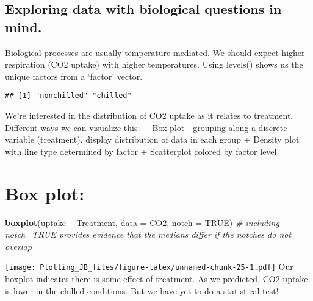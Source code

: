 \documentclass[]{article}
\newenvironment{Shaded}{\begin{snugshade}}{\end{snugshade}}
\newcommand{\CommentTok}[1]{\textcolor[rgb]{0.56,0.35,0.01}{\textit{#1}}}
\newcommand{\DataTypeTok}[1]{\textcolor[rgb]{0.13,0.29,0.53}{#1}}
\newcommand{\KeywordTok}[1]{\textcolor[rgb]{0.13,0.29,0.53}{\textbf{#1}}}
\newcommand{\NormalTok}[1]{#1}
\newcommand{\OperatorTok}[1]{\textcolor[rgb]{0.81,0.36,0.00}{\textbf{#1}}}
\newcommand{\OtherTok}[1]{\textcolor[rgb]{0.56,0.35,0.01}{#1}}
\newcommand{\StringTok}[1]{\textcolor[rgb]{0.31,0.60,0.02}{#1}}
\begin{document}
\hypertarget{exploring-data-with-biological-questions-in-mind.}{%
\subsection{Exploring data with biological questions in
mind.}\label{exploring-data-with-biological-questions-in-mind.}}

Biological processes are usually temperature mediated. We should expect
higher respiration (CO2 uptake) with higher temperatures. Using levels()
shows us the unique factors from a `factor' vector.

\begin{Shaded}
\end{Shaded}

\begin{verbatim}
## [1] "nonchilled" "chilled"
\end{verbatim}

We're interested in the distribution of CO2 uptake as it relates to
treatment. Different ways we can visualize this: + Box plot - grouping
along a discrete variable (treatment), display distribution of data in
each group + Density plot with line type determined by factor +
Scatterplot colored by factor level

\hypertarget{box-plot}{%
\section{Box plot:}\label{box-plot}}

\begin{Shaded}
\begin{Highlighting}[]
\KeywordTok{boxplot}\NormalTok{(uptake }\OperatorTok{~}\StringTok{ }\NormalTok{Treatment, }\DataTypeTok{data =}\NormalTok{ CO2, }\DataTypeTok{notch =} \OtherTok{TRUE}\NormalTok{) }\CommentTok{# including notch=TRUE provides evidence that the  medians differ if the notches do not overlap}
\end{Highlighting}
\end{Shaded}

\texttt{[image: Plotting\_JB\_files/figure-latex/unnamed-chunk-25-1.pdf]}
Our boxplot indicates there is some effect of treatment. As we
predicted, CO2 uptake is lower in the chilled conditions. But we have
yet to do a statistical test!
\end{document}
